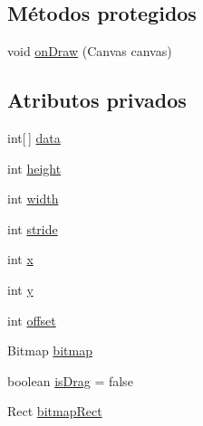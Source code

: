 \subsection*{Métodos protegidos}
\begin{DoxyCompactItemize}
\item 
void \hyperlink{classes_1_1ucm_1_1tfg_1_1controlremotolinux_1_1client_1_1view_1_1CanvasView_a2cf1a1ee87efc9948e1094d0b7852555}{on\-Draw} (Canvas canvas)
\end{DoxyCompactItemize}
\subsection*{Atributos privados}
\begin{DoxyCompactItemize}
\item 
int\mbox{[}$\,$\mbox{]} \hyperlink{classes_1_1ucm_1_1tfg_1_1controlremotolinux_1_1client_1_1view_1_1CanvasView_a379683c9544af8c623b8f49cf3062b88}{data}
\item 
int \hyperlink{classes_1_1ucm_1_1tfg_1_1controlremotolinux_1_1client_1_1view_1_1CanvasView_a68e85caf0a76be8f32eb052facfd309f}{height}
\item 
int \hyperlink{classes_1_1ucm_1_1tfg_1_1controlremotolinux_1_1client_1_1view_1_1CanvasView_a8a78b8d52c5a8dee1efc232c3b785f7e}{width}
\item 
int \hyperlink{classes_1_1ucm_1_1tfg_1_1controlremotolinux_1_1client_1_1view_1_1CanvasView_a63fe13f7edde39580f52dc14375feb08}{stride}
\item 
int \hyperlink{classes_1_1ucm_1_1tfg_1_1controlremotolinux_1_1client_1_1view_1_1CanvasView_af005a9add4d1ef816049f202ee288195}{x}
\item 
int \hyperlink{classes_1_1ucm_1_1tfg_1_1controlremotolinux_1_1client_1_1view_1_1CanvasView_ace7698a28d38fb30045ffd5548036cee}{y}
\item 
int \hyperlink{classes_1_1ucm_1_1tfg_1_1controlremotolinux_1_1client_1_1view_1_1CanvasView_aaad40278d6a02c9ef89b426c0af45dc3}{offset}
\item 
Bitmap \hyperlink{classes_1_1ucm_1_1tfg_1_1controlremotolinux_1_1client_1_1view_1_1CanvasView_a585b28da0c3fe8c11ab199516570666a}{bitmap}
\item 
boolean \hyperlink{classes_1_1ucm_1_1tfg_1_1controlremotolinux_1_1client_1_1view_1_1CanvasView_a488285310cfe212f86a95702de70f20b}{is\-Drag} = false
\item 
Rect \hyperlink{classes_1_1ucm_1_1tfg_1_1controlremotolinux_1_1client_1_1view_1_1CanvasView_a9c9c999fbb86a64a82aa8989c9d99a12}{bitmap\-Rect}

\end{DoxyCompactItemize}
